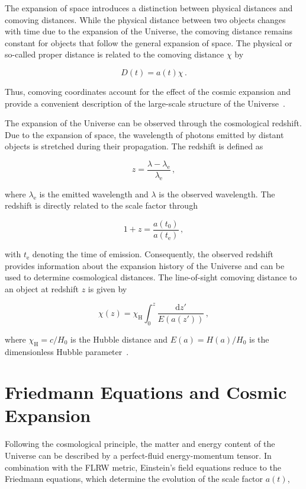 The expansion of space introduces a distinction between physical distances and 
comoving distances. While the physical distance between two objects changes 
with time due to the expansion of the Universe, the comoving distance remains 
constant for objects that follow the general expansion of space. The physical or so-called
proper distance is related to the comoving distance $\chi$ by

\begin{equation}
    D(t)=a(t) \chi \,.
\end{equation}

Thus, comoving coordinates account for
the effect of the cosmic expansion and provide a convenient description of the 
large-scale structure of the Universe~\cite{Ishak_2019}.

The expansion of the Universe can be observed through the cosmological 
redshift. Due to the expansion of space, the wavelength of photons emitted by 
distant objects is stretched during their propagation. 
The redshift is defined as

\begin{equation}
    z=\frac{\lambda-\lambda_{\mathrm{e}}}{\lambda_{\mathrm{e}}} \,,
\end{equation}

where $\lambda_{\mathrm{e}}$ is the emitted wavelength and $\lambda$ is the observed 
wavelength. The redshift is directly related to the scale factor through

\begin{equation}\label{eq:scale_factor_redshift_relation}
    1+z = \frac{a(t_0)}{a(t_{\mathrm{e}})} \,,
\end{equation}

with $t_{\mathrm{e}}$ denoting the time of emission.
Consequently, the observed redshift provides information about the expansion 
history of the Universe and can be used to determine cosmological distances. 
The line-of-sight comoving distance to an object at redshift $z$ is given by

\begin{equation}
    \chi(z)= \chi_{\mathrm{H}} \int_0^z \frac{\mathrm{d}z'}{E(a(z'))} \,,
\end{equation}

where $\chi_{\mathrm{H}} = c/H_0$ is the Hubble distance and $E(a)=H(a)/H_0$ is the dimensionless Hubble parameter~\cite{Hogg_2000}. 


\section{Friedmann Equations and Cosmic Expansion} \label{sec:friedmann_equations_and_cosmic_expansion}
Following the cosmological principle, the matter and energy content of the Universe can be described by 
a perfect-fluid energy-momentum tensor. In combination with the FLRW metric, Einstein's field equations 
reduce to the Friedmann equations, which determine the evolution of the scale factor $a(t)$,

